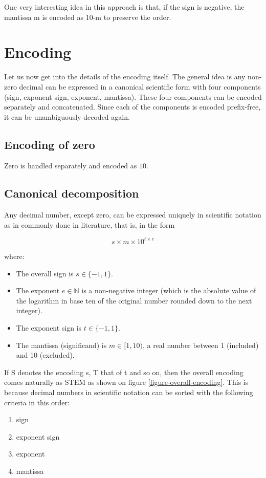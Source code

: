 \documentclass{acm_proc_article-sp}
\begin{document}
One very interesting idea in this approach is that, if the sign is negative, the mantissa m is encoded as 10-m to preserve the order.

\section{Encoding}

Let us now get into the details of the encoding itself. The general idea is any non-zero decimal can be expressed in a canonical scientific form with four components (sign, exponent sign, exponent, mantissa). These four components can be encoded separately and concatenated. Since each of the components is encoded prefix-free, it can be unambiguously decoded again.

\subsection{Encoding of zero}

Zero is handled separately and encoded as $10$.

\subsection{Canonical decomposition}

Any decimal number, except zero, can be expressed uniquely in scientific notation as in commonly done in literature, that is, in the form

$$s\times m \times10^{t\times e}$$

where:

\begin{itemize}
\item The overall sign is $s\in \{-1, 1\}$.
\item The exponent $e\in \mathbb{N}$ is a non-negative integer (which is the absolute value of the logarithm in base ten of the original number rounded down to the next integer).
\item The exponent sign is $t\in \{-1, 1\}$.
\item The mantissa (significand) is $m\in [1,10)$, a real number between 1 (included) and 10 (excluded).
\end{itemize}

If S denotes the encoding s, T that of t and so on, then the overall encoding comes naturally as STEM as shown on figure \ref{figure-overall-encoding}. This is because decimal numbers in scientific notation can be sorted with the following criteria in this order:
\begin{enumerate}
\item sign
\item exponent sign
\item exponent
\item mantissa
\end{enumerate}
\end{document}
